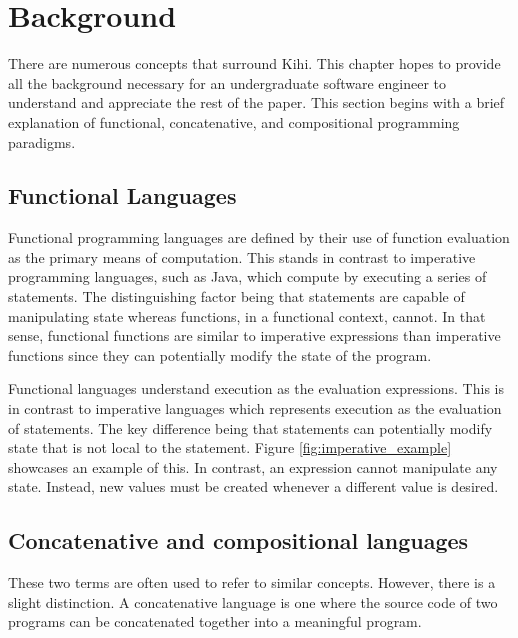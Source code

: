 \chapter{Background} \label{C:background} 
There are numerous concepts that surround Kihi.
This chapter hopes to provide all the background
necessary for an undergraduate software engineer
to understand and appreciate the rest of the paper.
This section begins with a brief explanation of 
functional, concatenative, and compositional
programming paradigms.

\section{Functional Languages}
Functional programming languages are defined by their use
of function evaluation as the primary means of computation.
This stands in contrast to imperative programming languages,
such as Java, which compute by executing a series of 
statements. The distinguishing factor being that statements
are capable of manipulating state whereas functions,
in a functional context, cannot.
In that sense, functional functions are similar to imperative
expressions than imperative functions since they can potentially
modify the state of the program.


Functional languages understand execution as the evaluation
expressions. This is in contrast to imperative languages
which represents execution as the evaluation of statements.
The key difference being that statements can potentially
modify state that is not local to the statement. 
Figure \ref{fig:imperative_example} showcases an example
of this. In contrast, an expression cannot manipulate any
state. Instead, new values must be created whenever a
different value is desired.






\section{Concatenative and compositional languages}
These two terms are often used to refer to similar concepts. However,
there is a slight distinction. A concatenative language is one
where the source code of two programs can be concatenated together
into a meaningful program.

